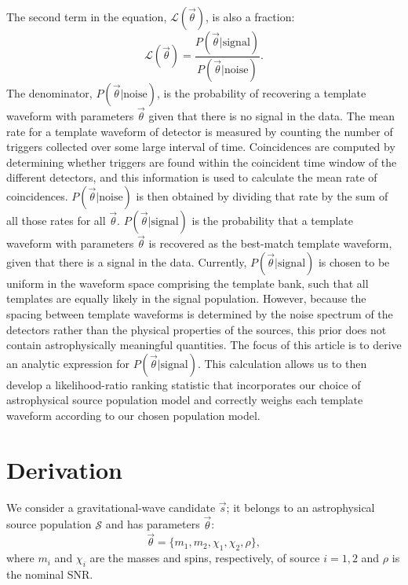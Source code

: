 \documentclass[twocolumn,showpacs,unsortedaddress,superscriptaddress,showkeys,nofootinbib,preprintnumbers,letterpaper]{revtex4-1}
\begin{document}
The second term in the equation, $\mathcal{L}(\vec{\theta})$, is also a fraction:
	\begin{equation}
	\mathcal{L}(\vec{\theta}) = \frac{P(\vec{\theta}|\text{signal})}{P(\vec{\theta}|\text{noise})}.
	\label{eqn:L_theta}
	\end{equation}
The denominator, $P(\vec{\theta}|\text{noise})$, is the probability of recovering a template waveform with parameters $\vec{\theta}$ given that there is no signal in the data. The mean rate for a template waveform of detector is measured by counting the number of triggers collected over some large interval of time. Coincidences are computed by determining whether triggers are found within the coincident time window of the different detectors, and this information is used to calculate the mean rate of coincidences. $P(\vec{\theta}|\text{noise})$ is then obtained by dividing that rate by the sum of all those rates for all $\vec\theta$. 
$P(\vec{\theta}|\text{signal})$ is the probability that a template waveform with parameters $\vec{\theta}$ is recovered as the best-match template waveform, given that there is a signal in the data. Currently, $P(\vec{\theta}|\text{signal})$ is chosen to be uniform in the waveform space comprising the template bank, such that all templates are equally likely in the signal population. However, because the spacing between template waveforms is determined by the noise spectrum of the detectors rather than the physical properties of the sources, this prior does not contain astrophysically meaningful quantities. The focus of this article is to derive an analytic expression for $P(\vec{\theta}|\text{signal})$. This calculation allows us to then develop a likelihood-ratio ranking statistic that incorporates our choice of astrophysical source population model and correctly weighs each template waveform according to our chosen population model. 


\section{Derivation} \label{sec:derivation}

We consider a gravitational-wave candidate $\vec{s}$; it belongs to an astrophysical source population $\mathcal{S}$ and has parameters $\vec\theta$:
   \begin{equation}
   \vec\theta = \{m_1,m_2,\chi_1,\chi_2,\rho\},
   \label{eqn:theta}
   \end{equation}
where $m_i$ and $\chi_i$ are the masses and spins, respectively, of source $i=1,2$ and $\rho$ is the nominal SNR. 
\end{document}
